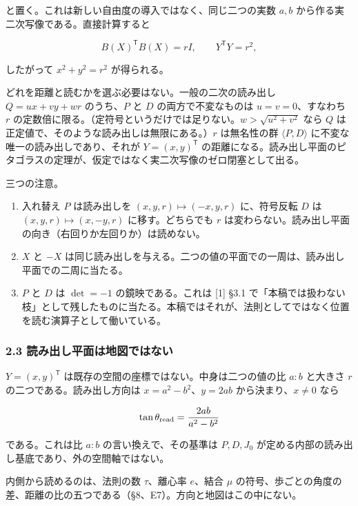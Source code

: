 \documentclass[
  a4paper,
]{ltjsarticle}
\begin{document}
と置く。これは新しい自由度の導入ではなく、同じ二つの実数 \(a,b\)
から作る実二次写像である。直接計算すると

\[
B(X)^{\mathsf T}B(X)=rI,
\qquad
Y^{\mathsf T}Y=r^2,
\]

したがって \(x^2+y^2=r^2\) が得られる。

どれを距離と読むかを選ぶ必要はない。一般の二次の読み出し \(Q=ux+vy+wr\)
のうち、\(P\) と \(D\) の両方で不変なものは \(u=v=0\)、すなわち \(r\)
の定数倍に限る。（定符号というだけでは足りない。\(w>\sqrt{u^2+v^2}\)
なら \(Q\) は正定値で、そのような読み出しは無限にある。）\(r\)
は無名性の群 \(\langle P,D\rangle\) に不変な唯一の読み出しであり、それが
\(Y=(x,y)^{\mathsf T}\)
の距離になる。読み出し平面のピタゴラスの定理が、仮定ではなく実二次写像のゼロ閉塞として出る。

三つの注意。

\begin{enumerate}
\def\labelenumi{(\roman{enumi})}
\item
  入れ替え \(P\) は読み出しを \((x,y,r)\mapsto(-x,y,r)\) に、符号反転
  \(D\) は \((x,y,r)\mapsto(x,-y,r)\) に移す。どちらでも \(r\)
  は変わらない。読み出し平面の向き（右回りか左回りか）は読めない。
\item
  \(X\) と \(-X\)
  は同じ読み出しを与える。二つの値の平面での一周は、読み出し平面での二周に当たる。
\item
  \(P\) と \(D\) は \(\det=-1\) の鏡映である。これは {[}1{]} §3.1
  で「本稿では扱わない枝」として残したものに当たる。本稿ではそれが、法則としてではなく位置を読む演算子として働いている。
\end{enumerate}

\subsubsection{2.3
読み出し平面は地図ではない}\label{ux8aadux307fux51faux3057ux5e73ux9762ux306fux5730ux56f3ux3067ux306fux306aux3044}

\(Y=(x,y)^{\mathsf T}\) は既存の空間の座標ではない。中身は二つの値の比
\(a:b\) と大きさ \(r\) の二つである。読み出し方向は
\(x=a^2-b^2\)、\(y=2ab\) から決まり、\(x\neq0\) なら

\[
\tan\theta_{\rm read}=\frac{2ab}{a^2-b^2}
\]

である。これは比 \(a:b\) の言い換えで、その基準は \(P,D,J_0\)
が定める内部の読み出し基底であり、外の空間軸ではない。

内側から読めるのは、法則の数 \(\tau\)、離心率 \(e\)、結合 \(\mu\)
の符号、歩ごとの角度の差、距離の比の五つである（§8、E7）。方向と地図はこの中にない。
\end{document}
